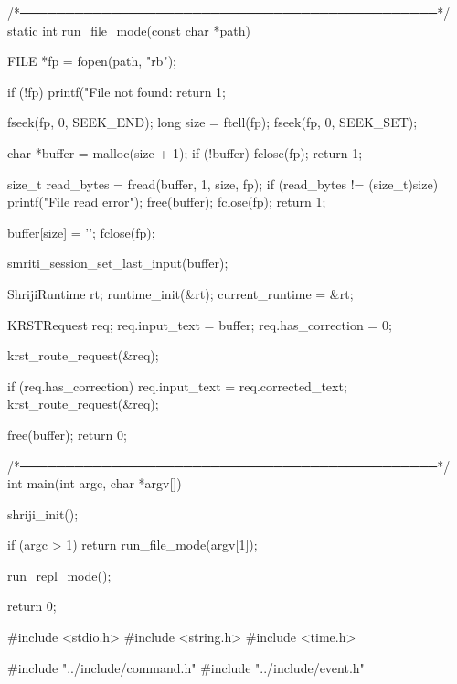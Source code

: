 \documentclass{article}
\begin{document}
/*──────────────────────────────────────────────*/
static int run_file_mode(const char *path)
{
    FILE *fp = fopen(path, "rb");

    if (!fp)
    {
        printf("File not found: %
        return 1;
    }

    fseek(fp, 0, SEEK_END);
    long size = ftell(fp);
    fseek(fp, 0, SEEK_SET);

    char *buffer = malloc(size + 1);
    if (!buffer)
    {
        fclose(fp);
        return 1;
    }

    size_t read_bytes = fread(buffer, 1, size, fp);
    if (read_bytes != (size_t)size)
    {
        printf("File read error\n");
        free(buffer);
        fclose(fp);
        return 1;
    }

    buffer[size] = '\0';
    fclose(fp);

    smriti_session_set_last_input(buffer);

    ShrijiRuntime rt;
    runtime_init(&rt);
    current_runtime = &rt;

    KRSTRequest req;
    req.input_text = buffer;
    req.has_correction = 0;

    krst_route_request(&req);

    if (req.has_correction)
    {
        req.input_text = req.corrected_text;
        krst_route_request(&req);
    }

    free(buffer);
    return 0;
}

/*──────────────────────────────────────────────*/
int main(int argc, char *argv[])
{
    shriji_init();

    if (argc > 1)
        return run_file_mode(argv[1]);

    run_repl_mode();

    return 0;
}
#include <stdio.h>
#include <string.h>
#include <time.h>

#include "../include/command.h"
#include "../include/event.h"
\end{document}
